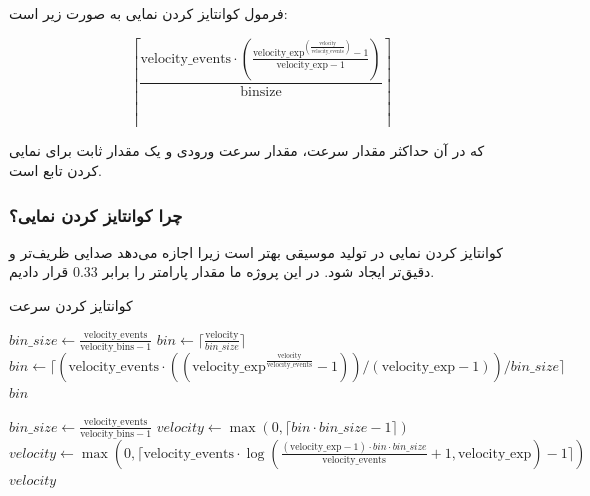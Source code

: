 فرمول کوانتایز کردن نمایی به صورت زیر است:
\begin{LTR}
      \setmainfont{Times New Roman}
$$
\left\lceil \frac{ \text{velocity\_events} \cdot \left( \frac{ \text{velocity\_exp}^{\left( \frac{\text{velocity}}{\text{velocity\_events}} \right)} - 1 }{ \text{velocity\_exp} - 1 } \right) }{ \text{binsize} } \right\rceil
$$
\end{LTR}

که در آن  حداکثر مقدار سرعت،  مقدار سرعت ورودی و
 یک مقدار ثابت برای نمایی کردن تابع است.

\subsubsection{چرا کوانتایز کردن
      نمایی؟}
کوانتایز کردن نمایی در تولید موسیقی بهتر است زیرا اجازه می‌دهد صدایی
ظریف‌تر و دقیق‌تر ایجاد شود. در این پروژه ما مقدار پارامتر  را برابر $0.33$ قرار دادیم.

\begin{LTR}
      \begin{algorithm}
            \caption{کوانتایز کردن سرعت}
            \label{alg:velocity_quantization}
            \begin{algorithmic}
                  \setmainfont{Times New Roman}
                  \State $bin\_size \gets \frac{\text{velocity\_events}}{\text{velocity\_bins} - 1}$
                  \State $bin \gets \lceil \frac{\text{velocity}}{bin\_size} \rceil$
                  \Else
                  \State $bin \gets \lceil \left( \text{velocity\_events} \cdot \left( \left( \text{velocity\_exp}^{ \frac{\text{velocity}}{\text{velocity\_events}} } - 1 \right) \right) / (\text{velocity\_exp} - 1) \right) / bin\_size \rceil$
                  \EndIf
                  \State \Return $bin$
                  \EndProcedure

                  \State $bin\_size \gets \frac{\text{velocity\_events}}{\text{velocity\_bins} - 1}$
                  \State $velocity \gets \max(0, \lceil bin \cdot bin\_size - 1 \rceil)$
                  \Else
                  \State $velocity \gets \max(0, \lceil \text{velocity\_events} \cdot \log \left( \frac{(\text{velocity\_exp} - 1) \cdot bin \cdot bin\_size}{\text{velocity\_events}} + 1, \text{velocity\_exp} \right) - 1 \rceil)$
                  \EndIf
                  \State \Return $velocity$
                  \EndProcedure
            \end{algorithmic}
      \end{algorithm}
\end{LTR}

